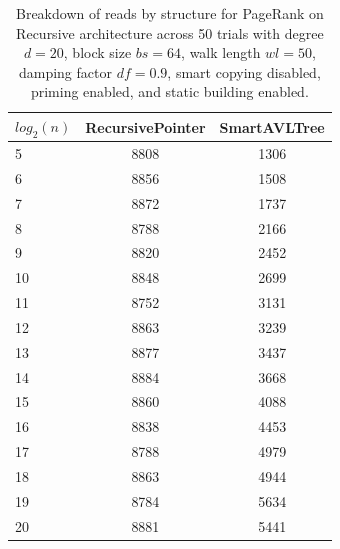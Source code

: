 \begin{table}[]
\centering
\begin{tabular}{|l|c|c|}
$log_2(n)$ & RecursivePointer & SmartAVLTree \\ \hline
5 & 8808 & 1306 \\ \hline
6 & 8856 & 1508 \\ \hline
7 & 8872 & 1737 \\ \hline
8 & 8788 & 2166 \\ \hline
9 & 8820 & 2452 \\ \hline
10 & 8848 & 2699 \\ \hline
11 & 8752 & 3131 \\ \hline
12 & 8863 & 3239 \\ \hline
13 & 8877 & 3437 \\ \hline
14 & 8884 & 3668 \\ \hline
15 & 8860 & 4088 \\ \hline
16 & 8838 & 4453 \\ \hline
17 & 8788 & 4979 \\ \hline
18 & 8863 & 4944 \\ \hline
19 & 8784 & 5634 \\ \hline
20 & 8881 & 5441 \\ \hline
\end{tabular}
\caption{Breakdown of reads by structure for PageRank on Recursive architecture across 50 trials with degree $d=20$, block size $bs=64$, walk length $wl=50$, damping factor $df=0.9$, smart copying disabled, priming enabled, and static building enabled.}
    \label{tab:reads_by_structure_pr_d20_bs64_trials50_copiesfalse_primetrue_staticinsertiontrue_wl50_df0.9_ptrecursive_movetrue}
\end{table}

